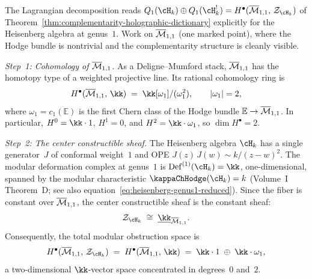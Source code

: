 \begin{computation}
\label{comp:complementarity-heisenberg-g1}

The Lagrangian decomposition reads
$Q_1(\cH_k) \oplus Q_1(\cH_k^!) = H^\bullet(\Mbar_{1,1},\, \cZ_{\cH_k})$
of Theorem~\ref{thm:complementarity-holographic-dictionary}
explicitly for the Heisenberg algebra at genus~$1$.
Work on $\overline{\mathcal{M}}_{1,1}$ (one marked point), where the Hodge
bundle is nontrivial and the complementarity structure is
cleanly visible.

\medskip
\noindent
\textit{Step~1: Cohomology of $\overline{\mathcal{M}}_{1,1}$.}\enspace
As a Deligne--Mumford stack, $\overline{\mathcal{M}}_{1,1}$ has the homotopy
type of a weighted projective line. Its rational cohomology
ring is
\begin{equation}\label{eq:complementarity-Mbar11-cohomology}
H^\bullet(\Mbar_{1,1},\,\kk)
\;=\;
\kk[\omega_1]/(\omega_1^2),
\qquad
|\omega_1| = 2,
\end{equation}
where $\omega_1 = c_1(\mathbb{E})$ is the first Chern class of
the Hodge bundle $\mathbb{E} \to \overline{\mathcal{M}}_{1,1}$. In particular,
$H^0 = \kk \cdot 1$, $H^1 = 0$, and
$H^2 = \kk \cdot \omega_1$, so $\dim H^\bullet = 2$.

\medskip
\noindent
\textit{Step~2: The center constructible sheaf.}\enspace
The Heisenberg algebra $\cH_k$ has a single generator~$J$ of
conformal weight~$1$ and OPE
$J(z)\,J(w) \sim k/(z-w)^2$.
The modular deformation complex at genus~$1$ is
$\mathrm{Def}^{(1)}(\cH_k) = \kk$, one-dimensional, spanned by
the modular characteristic $\kappaChHodge(\cH_k) = k$
(Volume~I Theorem~D; see also
equation~\eqref{eq:heisenberg-genus1-reduced}). Since the
fiber is constant over $\overline{\mathcal{M}}_{1,1}$, the center constructible
sheaf is the constant sheaf:
\[
\cZ_{\cH_k}
\;\cong\;
\underline{\kk}_{\Mbar_{1,1}}.
\]
Consequently, the total modular obstruction space is
\begin{equation}\label{eq:complementarity-total-space}
H^\bullet(\Mbar_{1,1},\, \cZ_{\cH_k})
\;=\;
H^\bullet(\Mbar_{1,1},\,\kk)
\;=\;
\kk \cdot 1 \;\oplus\; \kk \cdot \omega_1,
\end{equation}
a two-dimensional $\kk$-vector space concentrated in
degrees~$0$ and~$2$.


\end{computation}
